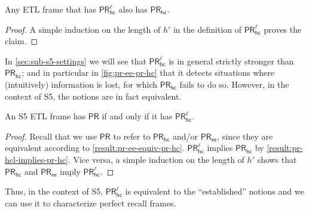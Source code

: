 \documentclass{article}
\newcommand{\PR}{\ensuremath{\mathsf{PR}}\xspace}
\newcommand{\PRhc}{\ensuremath{\mathsf{PR_{hc}}}\xspace}
\newcommand{\PRhcl}{\ensuremath{\mathsf{PR_{hc}^\ell}}\xspace}
\newcommand{\PRee}{\ensuremath{\mathsf{PR_{ee}}}\xspace}
\newcommand{\tiff}{if and only if\xspace}
\newcounter{#1}
\begin{document}
\begin{lemma}
  \label{result:pr-hcl-implies-pr-hc}
  Any ETL frame that has \PRhcl also has \PRhc.
\end{lemma}
\begin{proof}
  A simple induction on the length of $h'$ in the definition of \PRhcl proves the claim.
\end{proof}

In \cref{sec:sub-s5-settings} we will see that \PRhcl is in general strictly stronger than \PRhc;
and in particular in \cref{fig:pr-ee-pr-hc} that it detects situations where (intuitively) information is lost,
for which \PRhc fails to do so.
However, in the context of S5, the notions are in fact equivalent.

\begin{proposition}
  \label{result:pr-ee-equiv-pr-hc-equiv-pr-hcl}
  An S5 ETL frame has \PR \tiff it has \PRhcl.
\end{proposition}
\begin{proof}
  Recall that we use \PR to refer to \PRhc and/or \PRee,
  since they are equivalent according to \cref{result:pr-ee-equiv-pr-hc}.
  \PRhcl implies \PRhc by \cref{result:pr-hcl-implies-pr-hc}.
  Vice versa, a simple induction on the length of $h'$ shows that \PRhc and \PRee imply \PRhcl.
\end{proof}

Thus, in the context of S5, \PRhcl is equivalent to the ``established'' notions and
we can use it to characterize perfect recall frames.
\end{document}
